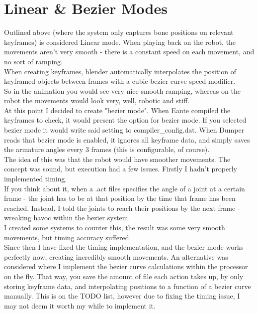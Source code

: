 			\section{Linear \& Bezier Modes}
				Outlined above (where the system only captures bone positions on relevant keyframes) is considered Linear mode. When playing back on the robot, the movements aren't very smooth - there is a constant speed on each movement, and no sort of ramping.\\
				
				When creating keyframes, blender automatically interpolates the position of keyframed objects between frames with a cubic bezier curve speed modifier.\\
				
				So in the animation you would see very nice smooth ramping, whereas on the robot the movements would look very, well, robotic and stiff. \\
				
				At this point I decided to create "bezier mode". When Eante compiled the keyframes to check, it would present the option for bezier mode. If you selected bezier mode it would write said setting to compiler\_config.dat. When Dumper reads that bezier mode is enabled, it ignores all keyframe data, and simply saves the armature angles every 3 frames (this is configurable, of course).\\
				
				The idea of this was that the robot would have smoother movements. The concept was sound, but execution had a few issues. Firstly I hadn't properly implemented timing.\\
				
				If you think about it, when a .act files specifies the angle of a joint at a certain frame - the joint has to be at that position by the time that frame has been reached. Instead, I told the joints to reach their positions by the next frame - wreaking havoc within the bezier system.\\
				
				I created some systems to counter this, the result was some very smooth movements, but timing accuracy suffered.\\
				
				Since then I have fixed the timing implementation, and the bezier mode works perfectly now, creating incredibly smooth movements. An alternative was considered where I implement the bezier curve calculations within the processor on the fly. That way, you save the amount of file each action takes up, by only storing keyframe data, and interpolating positions to a function of a bezier curve manually. This is on the TODO list, however due to fixing the timing issue, I may not deem it worth my while to implement it.\\